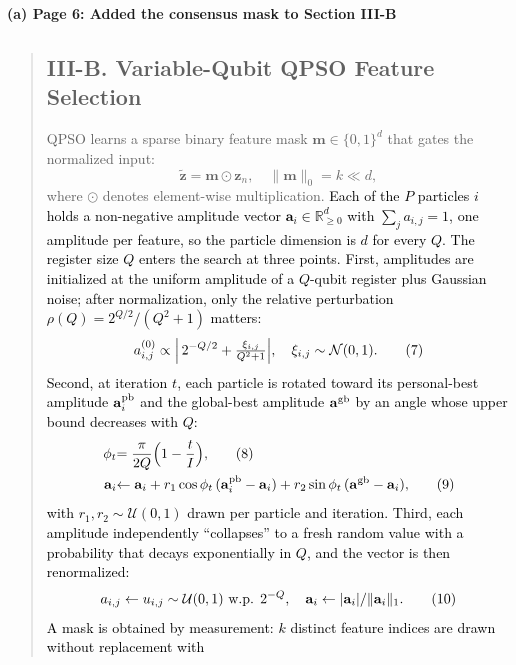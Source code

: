 \documentclass[11pt]{article}
\newenvironment{excerpt}{\begin{quote}\sloppy}{\end{quote}}
\newcommand{\mshead}[2]{\subsection*{\textbf{#1. #2}}}
\newcommand{\loc}[1]{\par\medskip\noindent\textbf{#1}\par}
\begin{document}
\loc{(a) Page 6: Added the consensus mask to Section III-B}
\begin{excerpt}
\mshead{III-B}{Variable-Qubit QPSO Feature Selection}


QPSO learns a sparse binary feature mask
$\mathbf{m}\in\{0,1\}^d$ that gates the normalized input:
\begin{equation}
\tilde{\mathbf{z}} = \mathbf{m}\odot\mathbf{z}_n,\quad
\|\mathbf{m}\|_0 = k \ll d,
\tag{6}
\end{equation}
where $\odot$ denotes element-wise multiplication.
\textcolor{black}{Each of the $P$ particles $i$ holds a
non-negative amplitude vector $\mathbf{a}_i\in\mathbb{R}_{\ge 0}^{d}$
with $\sum_j a_{i,j}=1$, one amplitude per feature, so the particle
dimension is $d$ for every $Q$. The register size $Q$ enters the
search at three points. First, amplitudes are initialized at the
uniform amplitude of a $Q$-qubit register plus Gaussian noise; after
normalization, only the relative perturbation
$\rho(Q)=2^{Q/2}/(Q^{2}+1)$ matters:}
\begin{equation}
\textcolor{black}{a_{i,j}^{(0)} \propto \Bigl|\,2^{-Q/2} +
\tfrac{\xi_{i,j}}{Q^{2}+1}\Bigr|,\quad
\xi_{i,j}\sim\mathcal{N}(0,1).}
\tag{7}
\end{equation}
\textcolor{black}{Second, at iteration $t$, each particle is
rotated toward its personal-best amplitude $\mathbf{a}_i^{\rm pb}$
and the global-best amplitude $\mathbf{a}^{\rm gb}$ by an angle whose
upper bound decreases with $Q$:}
\begin{align}
\textcolor{black}{\phi_t} &\textcolor{black}{= \frac{\pi}{2Q}\Bigl(1-\frac{t}{I}\Bigr),}
\tag{8}\\
\textcolor{black}{\mathbf{a}_i} &\textcolor{black}{\leftarrow \mathbf{a}_i
+ r_1\cos\phi_t\,(\mathbf{a}_i^{\rm pb}-\mathbf{a}_i)
+ r_2\sin\phi_t\,(\mathbf{a}^{\rm gb}-\mathbf{a}_i),}
\tag{9}
\end{align}
\textcolor{black}{with $r_1,r_2\sim\mathcal{U}(0,1)$ drawn per
particle and iteration. Third, each amplitude independently
``collapses'' to a fresh random value with a probability that decays
exponentially in $Q$, and the vector is then renormalized:}
\begin{equation}
\textcolor{black}{a_{i,j} \leftarrow u_{i,j}\sim\mathcal{U}(0,1)
\ \text{w.p. } 2^{-Q},\quad
\mathbf{a}_i \leftarrow |\mathbf{a}_i| / \|\mathbf{a}_i\|_1 .}
\tag{10}
\end{equation}
\textcolor{black}{A mask is obtained by measurement: $k$
distinct feature indices are drawn without replacement with
}
\end{excerpt}
\end{document}

